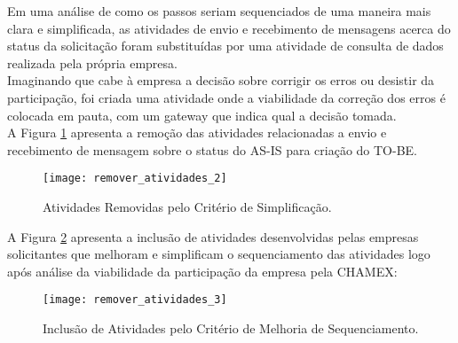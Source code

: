 Em uma análise de como os passos seriam sequenciados de uma maneira mais clara e simplificada, as atividades de envio e recebimento de mensagens acerca do status da solicitação foram substituídas por uma atividade de consulta de dados realizada pela própria empresa. 
\\ \indent Imaginando que cabe à empresa a decisão sobre corrigir os erros ou desistir da participação, foi criada uma atividade onde a viabilidade da correção dos erros é colocada em pauta, com um gateway que indica qual a decisão tomada.
\\ \indent A Figura \ref{fig:atividaderemovidadois} apresenta a remoção das atividades relacionadas a envio e recebimento de mensagem sobre o status do AS-IS para criação do TO-BE.
\begin{figure}[H]
	\centering
	\texttt{[image: remover\_atividades\_2]}
	\caption[Atividades Removidas pelo Critério de Simplificação]{Atividades Removidas pelo Critério de Simplificação.}
	\label{fig:atividaderemovidadois}
\end{figure}
A Figura \ref{fig:atividaderemovidatres} apresenta a inclusão de atividades desenvolvidas pelas empresas solicitantes que melhoram e simplificam o sequenciamento das atividades logo após análise da viabilidade da participação da empresa pela CHAMEX:
\begin{figure}[H]
	\centering
	\texttt{[image: remover\_atividades\_3]}
	\caption[Inclusão de Atividades pelo Critério de Melhoria de Sequenciamento]{Inclusão de Atividades pelo Critério de Melhoria de Sequenciamento.}
	\label{fig:atividaderemovidatres}
\end{figure}